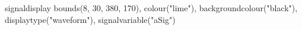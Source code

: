 signaldisplay bounds(8, 30, 380, 170), colour("lime"), backgroundcolour("black"), displaytype("waveform"), signalvariable("aSig")